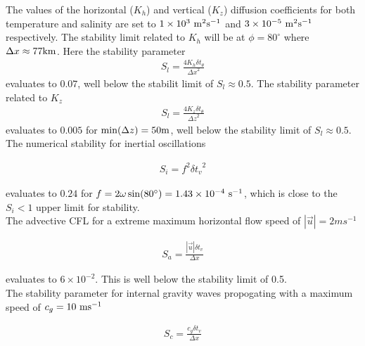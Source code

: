 {The values of the horizontal ($K_{h}$) and vertical ($K_{z}$) diffusion coefficients 
for both temperature and salinity are set to $1 \times 10^{3}~{\rm m}^{2}{\rm s}^{-1}$ 
and $3 \times 10^{-5}~{\rm m}^{2}{\rm s}^{-1}$ respectively. The stability limit 
related to $K_{h}$ will be at $\phi=80^{\circ}$ where $\Delta x \approx 77 {\rm km}$. 
Here the stability parameter 
\begin{eqnarray} 
\label{EQ:laplacian_stability_xtheta}
S_{l} = \frac{4 K_{h} \delta t_{\theta}}{{\Delta x}^2} 
\end{eqnarray}
evaluates to $0.07$, well below the stabilit limit of $S_{l} \approx 0.5$. The 
stability parameter related to $K_{z}$
\begin{eqnarray} 
\label{EQ:laplacian_stability_ztheta}
S_{l} = \frac{4 K_{z} \delta t_{\theta}}{{\Delta z}^2} 
\end{eqnarray}
evaluates to $0.005$ for $\min(\Delta z)=50{\rm m}$, well below the stability limit 
of $S_{l} \approx 0.5$.
\\

\noindent The numerical stability for inertial oscillations
\cite{Adcroft_thesis} 

\begin{eqnarray}
\label{EQ:inertial_stability}
S_{i} = f^{2} {\delta t_v}^2
\end{eqnarray}

\noindent evaluates to $0.24$ for $f=2\omega\sin(80^{\circ})=1.43\times10^{-4}~{\rm s}^{-1}$, which is close to 
the $S_{i} < 1$ upper limit for stability.
\\

\noindent The advective CFL \cite{Adcroft_thesis} for a extreme maximum 
horizontal flow
speed of $ | \vec{u} | = 2 ms^{-1}$

\begin{eqnarray}
\label{EQ:cfl_stability}
S_{a} = \frac{| \vec{u} | \delta t_{v}}{ \Delta x}
\end{eqnarray}

\noindent evaluates to $6 \times 10^{-2}$. This is well below the stability 
limit of 0.5.
\\

\noindent The stability parameter for internal gravity waves propogating
with a maximum speed of $c_{g}=10~{\rm ms}^{-1}$
\cite{Adcroft_thesis}

\begin{eqnarray}
\label{EQ:cfl_stability}
S_{c} = \frac{c_{g} \delta t_{v}}{ \Delta x}
\end{eqnarray}

}
